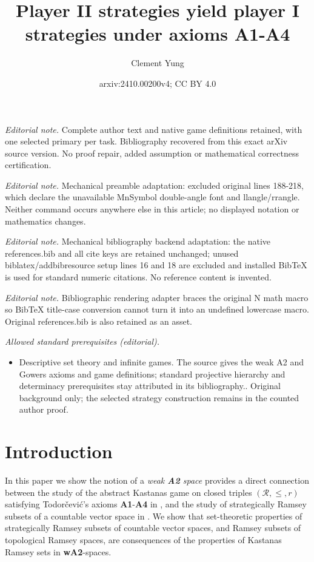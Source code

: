 \documentclass[11pt,reqno]{amsart}
\title{Player II strategies yield player I strategies under axioms A1-A4}
\author{Clement Yung}
\date{arxiv:2410.00200v4; CC BY 4.0}
\theoremstyle{plain}
\numberwithin{equation}{section}
\theoremstyle{definition}
\newcommand{\cal}{\mathcal}
\begin{document}
\maketitle
\noindent\textit{Editorial note.} Complete author text and native game definitions retained, with one selected primary per task. Bibliography recovered from this exact arXiv source version. No proof repair, added assumption or mathematical correctness certification.\par\medskip
\noindent\textit{Editorial note.} Mechanical preamble adaptation: excluded original lines 188-218, which declare the unavailable MnSymbol double-angle font and llangle/rrangle. Neither command occurs anywhere else in this article; no displayed notation or mathematics changes.\par\medskip
\noindent\textit{Editorial note.} Mechanical bibliography backend adaptation: the native references.bib and all cite keys are retained unchanged; unused biblatex/addbibresource setup lines 16 and 18 are excluded and installed BibTeX is used for standard numeric citations. No reference content is invented.\par\medskip
\noindent\textit{Editorial note.} Bibliographic rendering adapter braces the original N math macro so BibTeX title-case conversion cannot turn it into an undefined lowercase macro. Original references.bib is also retained as an asset.\par\medskip
\noindent\textit{Allowed standard prerequisites (editorial).}\begin{itemize}
\item Descriptive set theory and infinite games. The source gives the weak A2 and Gowers axioms and game definitions; standard projective hierarchy and determinacy prerequisites stay attributed in its bibliography.. Original background only; the selected strategy construction remains in the counted author proof.
\end{itemize}\medskip
\section{Introduction}
In this paper we show the notion of a \emph{weak \textbf{A2} space} provides a direct connection between the study of the abstract Kastanas game on closed triples $(\cal{R},\leq,r)$ satisfying Todor\v{c}evi\'{c}'s axioms \textbf{A1}-\textbf{A4} in \cite{CD23}, and the study of strategically Ramsey subsets of a countable vector space in \cite{R08}. We show that set-theoretic properties of strategically Ramsey subsets of countable vector spaces, and Ramsey subsets of topological Ramsey spaces, are consequences of the properties of Kastanas Ramsey sets in \textbf{wA2}-spaces. 
\end{document}
